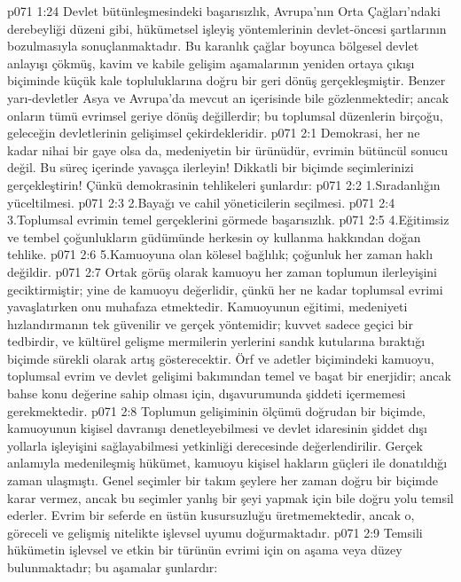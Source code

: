 \vs p071 1:24 Devlet bütünleşmesindeki başarısızlık, Avrupa’nın Orta Çağları’ndaki derebeyliği düzeni gibi, hükümetsel işleyiş yöntemlerinin devlet\hyp{}öncesi şartlarının bozulmasıyla sonuçlanmaktadır. Bu karanlık çağlar boyunca bölgesel devlet anlayışı çökmüş, kavim ve kabile gelişim aşamalarının yeniden ortaya çıkışı biçiminde küçük kale topluluklarına doğru bir geri dönüş gerçekleşmiştir. Benzer yarı\hyp{}devletler Asya ve Avrupa’da mevcut an içerisinde bile gözlenmektedir; ancak onların tümü evrimsel geriye dönüş değillerdir; bu toplumsal düzenlerin birçoğu, geleceğin devletlerinin gelişimsel çekirdekleridir.
\vs p071 2:1 Demokrasi, her ne kadar nihai bir gaye olsa da, medeniyetin bir ürünüdür, evrimin bütüncül sonucu değil. Bu süreç içerinde yavaşça ilerleyin! Dikkatli bir biçimde seçimlerinizi gerçekleştirin! Çünkü demokrasinin tehlikeleri şunlardır:
\vs p071 2:2 1.\bibnobreakspace Sıradanlığın yüceltilmesi.
\vs p071 2:3 2.\bibnobreakspace Bayağı ve cahil yöneticilerin seçilmesi.
\vs p071 2:4 3.\bibnobreakspace Toplumsal evrimin temel gerçeklerini görmede başarısızlık.
\vs p071 2:5 4.\bibnobreakspace Eğitimsiz ve tembel çoğunlukların güdümünde herkesin oy kullanma hakkından doğan tehlike.
\vs p071 2:6 5.\bibnobreakspace Kamuoyuna olan kölesel bağlılık; çoğunluk her zaman haklı değildir.
\vs p071 2:7 Ortak görüş olarak kamuoyu her zaman toplumun ilerleyişini geciktirmiştir; yine de kamuoyu değerlidir, çünkü her ne kadar toplumsal evrimi yavaşlatırken onu muhafaza etmektedir. Kamuoyunun eğitimi, medeniyeti hızlandırmanın tek güvenilir ve gerçek yöntemidir; kuvvet sadece geçici bir tedbirdir, ve kültürel gelişme mermilerin yerlerini sandık kutularına bıraktığı biçimde sürekli olarak artış gösterecektir. Örf ve adetler biçimindeki kamuoyu, toplumsal evrim ve devlet gelişimi bakımından temel ve başat bir enerjidir; ancak bahse konu değerine sahip olması için, dışavurumunda şiddeti içermemesi gerekmektedir.
\vs p071 2:8 Toplumun gelişiminin ölçümü doğrudan bir biçimde, kamuoyunun kişisel davranışı denetleyebilmesi ve devlet idaresinin şiddet dışı yollarla işleyişini sağlayabilmesi yetkinliği derecesinde değerlendirilir. Gerçek anlamıyla medenileşmiş hükümet, kamuoyu kişisel hakların güçleri ile donatıldığı zaman ulaşmıştı. Genel seçimler bir takım şeylere her zaman doğru bir biçimde karar vermez, ancak bu seçimler yanlış bir şeyi yapmak için bile doğru yolu temsil ederler. Evrim bir seferde en üstün kusursuzluğu üretmemektedir, ancak o, göreceli ve gelişmiş nitelikte işlevsel uyumu doğurmaktadır.
\vs p071 2:9 Temsili hükümetin işlevsel ve etkin bir türünün evrimi için on aşama veya düzey bulunmaktadır; bu aşamalar şunlardır:
